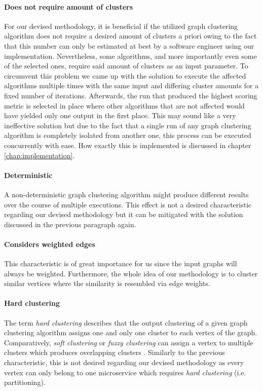 \documentclass[12pt,a4paper]{report}
\begin{document}
\paragraph{Does not require amount of clusters} \label{graph-clustering-algorithm-survey-amount-of-clusters}
For our devised methodology, it is beneficial if the utilized graph clustering
algorithm does not require a desired amount of clusters a priori owing to
the fact that this number can only be estimated at best by a software engineer
using our implementation.
Nevertheless, some algorithms, and more importantly even some of the selected ones,
require said amount of clusters as an input parameter.
To circumvent this problem we came up with the solution to execute the affected
algorithms multiple times with the same input and differing cluster amounts
for a fixed number of iterations. Afterwards, the run that produced the highest
scoring metric is selected in place where other algorithms that are not affected
would have yielded only one output in the first place.
This may sound like a very ineffective solution but due to the fact that
a single run of any graph clustering algorithm is completely isolated from
another one, this process can be executed concurrently with ease.
How exactly this is implemented is discussed in chapter \ref{chap:implementation}.

\paragraph{Deterministic}
A non\hyp deterministic graph clustering algorithm might produce different
results over the course of multiple executions. This effect is not a desired
characteristic regarding our devised methodology but it can be mitigated
with the solution discussed in the previous paragraph again.

\paragraph{Considers weighted edges}
This characteristic is of great importance for us since the input graphs
will always be weighted. Furthermore, the whole idea of our methodology
is to cluster similar vertices where the similarity is resembled via edge weights.

\paragraph{Hard clustering}
The term \textit{hard clustering} describes that the output clustering
of a given graph clustering algorithm assigns one and only one cluster
to each vertex of the graph. Comparatively, \textit{soft clustering} or
\textit{fuzzy clustering} can assign a vertex to multiple clusters which
produces overlapping clusters \cite{lancichinetti2009community}.
Similarly to the previous characteristic, this is not desired regarding our
devised methodology as every vertex can only belong to one microservice
which requires \textit{hard clustering} (i.e. partitioning).
\end{document}
